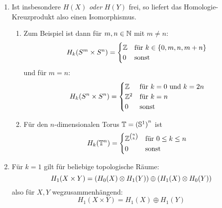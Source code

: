 \begin{beispiel}
  \begin{enumerate}
    \item
      Ist insbesondere $H(X)$ \emph{oder} $H(Y)$ frei, so liefert das Homologie-Kreuzprodukt also einen Isomorphismus.
      \begin{enumerate}
        \item
          Zum Beispiel ist dann für $m,n \in \mathbb{N}$ mit $m \neq n$:
          \begin{equation*}
            H_k(S^m \times S^n) =
            \begin{cases}
              \mathbb{Z} & \text{für $k \in \left\{ 0,m,n,m+n \right\}$} \\
              0 & \text{sonst}
            \end{cases}
          \end{equation*}
          und für $m = n$:
          \begin{equation*}
            H_k(S^n \times S^n) = 
            \begin{cases}
              \mathbb{Z} & \text{für $k = 0$ und $k = 2n$} \\
              \mathbb{Z}^2 & \text{für $k = n$} \\
              0 & \text{sonst}
            \end{cases}
          \end{equation*}
        \item
          Für den $n$-dimensionalen Torus $\mathbb{T} = {(\mathbb{S}^1)}^n$ ist
          \begin{equation*}
            H_k(\mathbb{T}^n) =
            \begin{cases}
              \mathbb{Z}^{\binom{n}{k}} & \text{für $0 \le k \le n$} \\
              0 & \text{sonst}
            \end{cases}
          \end{equation*}
      \end{enumerate}
    \item
      Für $k = 1$ gilt für beliebige topologische Räume:
      \begin{equation*}
        H_1(X \times Y) = (H_0(X) \otimes H_1(Y)) \oplus (H_1(X) \otimes H_0(Y))
      \end{equation*}
      also für $X,Y$ wegzusammenhängend:
      \begin{equation*}
        H_1(X \times Y) = H_1(X) \oplus H_1(Y)
      \end{equation*}
  \end{enumerate}
\end{beispiel}
